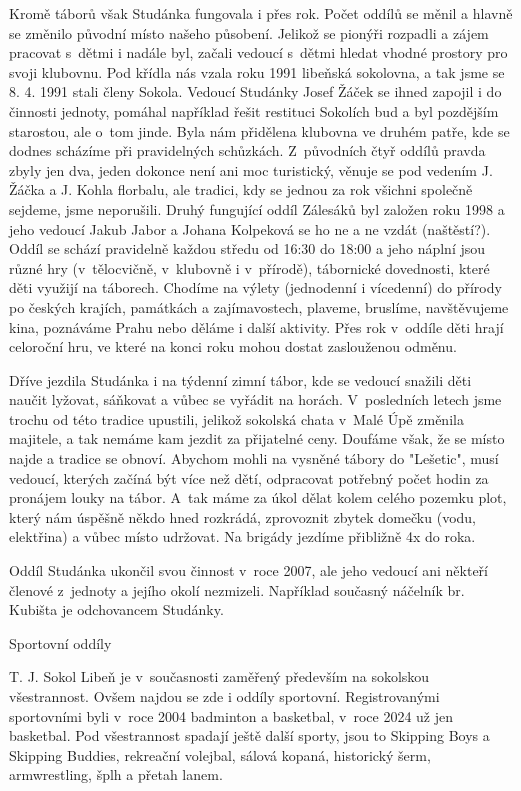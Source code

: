 \documentclass[a5paper, 12pt, twoside]{article}
\begin{document}
Kromě táborů však Studánka fungovala i přes rok. Počet oddílů se měnil a
hlavně se změnilo původní místo našeho působení. Jelikož se pionýři
rozpadli a zájem pracovat s~dětmi i nadále byl, začali vedoucí s~dětmi
hledat vhodné prostory pro svoji klubovnu. Pod křídla nás vzala roku
1991 libeňská sokolovna, a tak jsme se 8. 4. 1991 stali členy Sokola.
Vedoucí Studánky Josef Žáček se ihned zapojil i do činnosti jednoty,
pomáhal například řešit restituci Sokolích bud a byl pozdějším
starostou, ale o~tom jinde. Byla nám přidělena klubovna ve druhém patře,
kde se dodnes scházíme při pravidelných schůzkách. Z~původních čtyř
oddílů pravda zbyly jen dva, jeden dokonce není ani moc turistický,
věnuje se pod vedením J. Žáčka a J. Kohla florbalu, ale tradici, kdy se
jednou za rok všichni společně sejdeme, jsme neporušili. Druhý fungující
oddíl Zálesáků byl založen roku 1998 a jeho vedoucí Jakub Jabor a Johana
Kolpeková se ho ne a ne vzdát (naštěstí?). Oddíl se schází pravidelně
každou středu od 16:30 do 18:00 a jeho náplní jsou různé hry
(v~tělocvičně, v~klubovně i v~přírodě), tábornické dovednosti, které děti
využijí na táborech. Chodíme na výlety (jednodenní i vícedenní) do
přírody po českých krajích, památkách a zajímavostech, plaveme,
bruslíme, navštěvujeme kina, poznáváme Prahu nebo děláme i další
aktivity. Přes rok v~oddíle děti hrají celoroční hru, ve které na konci
roku mohou dostat zaslouženou odměnu.

Dříve jezdila Studánka i na týdenní zimní tábor, kde se vedoucí snažili
děti naučit lyžovat, sáňkovat a vůbec se vyřádit na horách. V~posledních
letech jsme trochu od této tradice upustili, jelikož sokolská chata
v~Malé Úpě změnila majitele, a tak nemáme kam jezdit za přijatelné ceny.
Doufáme však, že se místo najde a tradice se obnoví. Abychom mohli na
vysněné tábory do "Lešetic", musí vedoucí, kterých začíná být více než
dětí, odpracovat potřebný počet hodin za pronájem louky na tábor. A~tak
máme za úkol dělat kolem celého pozemku plot, který nám úspěšně někdo
hned rozkrádá, zprovoznit zbytek domečku (vodu, elektřina) a vůbec místo
udržovat. Na brigády jezdíme přibližně 4x do roka.

Oddíl Studánka ukončil svou činnost v~roce 2007, ale jeho vedoucí ani
někteří členové z~jednoty a jejího okolí nezmizeli. Například současný
náčelník br. Kubišta je odchovancem Studánky.

Sportovní oddíly

T. J. Sokol Libeň je v~současnosti zaměřený především na sokolskou
všestrannost. Ovšem najdou se zde i oddíly sportovní. Registrovanými
sportovními byli v~roce 2004 badminton a basketbal, v~roce 2024 už jen
basketbal. Pod všestrannost spadají ještě další sporty, jsou to Skipping
Boys a Skipping Buddies, rekreační volejbal, sálová kopaná, historický
šerm, armwrestling, šplh a přetah lanem.
\end{document}
